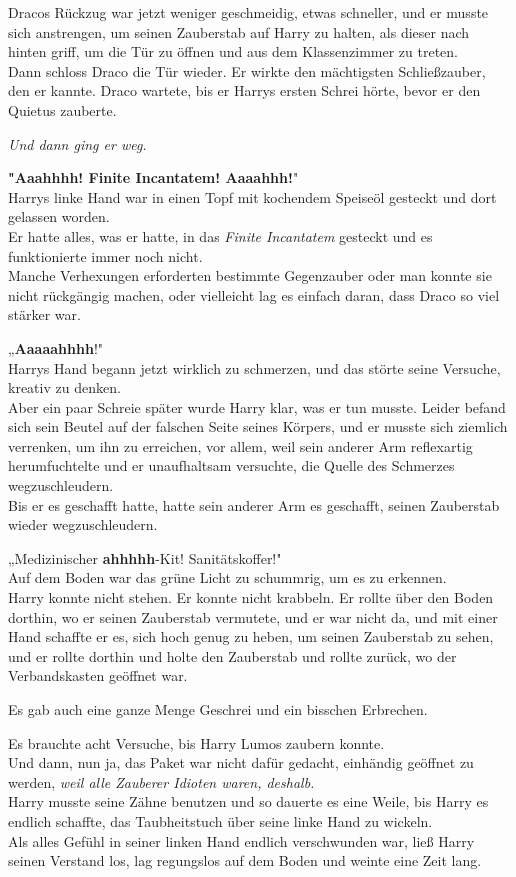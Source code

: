 {Dracos Rückzug war jetzt weniger geschmeidig, etwas schneller, und er musste sich anstrengen, um seinen Zauberstab auf Harry zu halten, als dieser nach hinten griff, um die Tür zu öffnen und aus dem Klassenzimmer zu treten.\\ Dann schloss Draco die Tür wieder. Er wirkte den mächtigsten Schließzauber, den er kannte. Draco wartete, bis er Harrys ersten Schrei hörte, bevor er den Quietus zauberte.

\emph{Und dann ging er weg.}

\textbf{"Aaahhhh! Finite Incantatem! Aaaahhh!}"\\ Harrys linke Hand war in einen Topf mit kochendem Speiseöl gesteckt und dort gelassen worden.\\ Er hatte alles, was er hatte, in das \emph{Finite Incantatem} gesteckt und es funktionierte immer noch nicht.\\ Manche Verhexungen erforderten bestimmte Gegenzauber oder man konnte sie nicht rückgängig machen, oder vielleicht lag es einfach daran, dass Draco so viel stärker war.

„\textbf{Aaaaahhhh}!"\\ Harrys Hand begann jetzt wirklich zu schmerzen, und das störte seine Versuche, kreativ zu denken.\\ Aber ein paar Schreie später wurde Harry klar, was er tun musste. Leider befand sich sein Beutel auf der falschen Seite seines Körpers, und er musste sich ziemlich verrenken, um ihn zu erreichen, vor allem, weil sein anderer Arm reflexartig herumfuchtelte und er unaufhaltsam versuchte, die Quelle des Schmerzes wegzuschleudern.\\ Bis er es geschafft hatte, hatte sein anderer Arm es geschafft, seinen Zauberstab wieder wegzuschleudern.

„Medizinischer \textbf{ahhhhh}-Kit! Sanitätskoffer!"\\ Auf dem Boden war das grüne Licht zu schummrig, um es zu erkennen.\\ Harry konnte nicht stehen. Er konnte nicht krabbeln. Er rollte über den Boden dorthin, wo er seinen Zauberstab vermutete, und er war nicht da, und mit einer Hand schaffte er es, sich hoch genug zu heben, um seinen Zauberstab zu sehen, und er rollte dorthin und holte den Zauberstab und rollte zurück, wo der Verbandskasten geöffnet war.

Es gab auch eine ganze Menge Geschrei und ein bisschen Erbrechen.

Es brauchte acht Versuche, bis Harry Lumos zaubern konnte.\\ Und dann, nun ja, das Paket war nicht dafür gedacht, einhändig geöffnet zu werden, \emph{weil alle Zauberer Idioten waren, deshalb.}\\ Harry musste seine Zähne benutzen und so dauerte es eine Weile, bis Harry es endlich schaffte, das Taubheitstuch über seine linke Hand zu wickeln.\\ Als alles Gefühl in seiner linken Hand endlich verschwunden war, ließ Harry seinen Verstand los, lag regungslos auf dem Boden und weinte eine Zeit lang.

}
